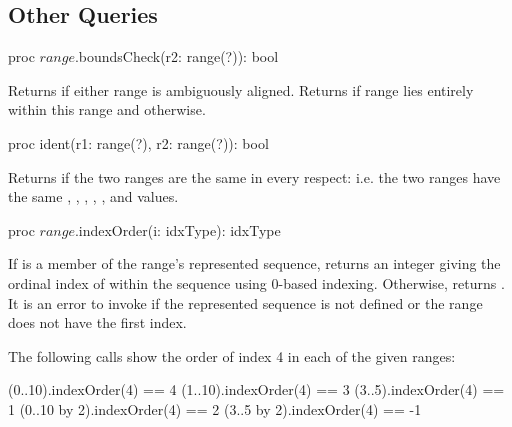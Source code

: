\subsection{Other Queries}
\label{Range_Queries}

\begin{protohead}
proc $range$.boundsCheck(r2: range(?)): bool
\end{protohead}
\begin{protobody}
Returns  if either range is ambiguously aligned.
Returns  if range  lies entirely within this range
and  otherwise.  
\end{protobody}

\begin{protohead}
proc ident(r1: range(?), r2: range(?)): bool
\end{protohead}
\begin{protobody}
Returns  if the two ranges are the same in every respect: i.e. the
two ranges have the same ,
, , , ,  and
 values.
\end{protobody}

\begin{protohead}
proc $range$.indexOrder(i: idxType): idxType
\end{protohead}
\begin{protobody}
If  is a member of the range's represented sequence, returns an integer giving
the ordinal index of  within the sequence using 0-based indexing.
Otherwise, returns .
It is an error to invoke  if the represented sequence
is not defined or the range does not have the first index.
\end{protobody}

\begin{example}
The following calls show the order of index 4 in each of the given
ranges:
\begin{chapel}
(0..10).indexOrder(4) == 4
(1..10).indexOrder(4) == 3
(3..5).indexOrder(4) == 1
(0..10 by 2).indexOrder(4) == 2
(3..5 by 2).indexOrder(4) == -1
\end{chapel}
\end{example}

